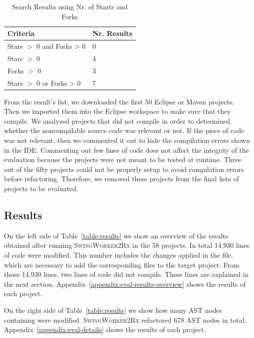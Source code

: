 \documentclass[type=bsc,accentcolor=tud9c]{tudthesis}
\newcommand{\toolextension}{\textsc{SwingWorker2Rx}}
\begin{document}
\begin{table}[h]
\begin{center}
\begin{tabular}{|p{5cm}|C{3cm}|}
\hline
\bf Criteria & \bf Nr. Results\\\hline
Stars $>$ 0 and Forks > 0 & 0\\
Stars $>$ 0 & 4\\
Forks $>$ 0 & 3\\
Stars $>$ 0 or Forks > 0 & 7\\
\hline
\end{tabular}
\end{center}
\caption{Search Results using Nr. of Starts and Forks}
\label{table:results-starts-forks}
\end{table}

From the result's list, we downloaded the first 50 Eclipse or Maven projects. Then we imported them into the Eclipse workspace to make sure that they compile. We analyzed projects that did not compile in order to determined whether the noncompilable source code was  relevant or not. If the piece of code was not  relevant, then we commented it out to hide the compilation errors shown in the IDE. Commenting out few lines of code does not affect the integrity of the evaluation because the projects were not meant to be tested at runtime. Three out of the fifty projects could not be properly setup to avoid compilation errors before refactoring. Therefore, we removed these projects from the final lists of projects to be evaluated.

\subsection{Results}
On the left side of Table~\ref{table:results} we show an overview of the results obtained after running \toolextension{} in the 58 projects. In total 14,930 lines of code were modified. This number includes the changes applied in the  file, which are necessary to add the corresponding  files to the target project. From those 14,930 lines, two lines of code did not compile. These lines are explained in the next section. Appendix~\ref{appendix:eval-results-overview} shows the results of each project.

On the right side of Table~\ref{table:results} we show how many AST nodes containing  were modified. \toolextension{} refactored 678 AST nodes in total. Appendix~\ref{appendix:eval-details} shows the results of each project.
\end{document}
